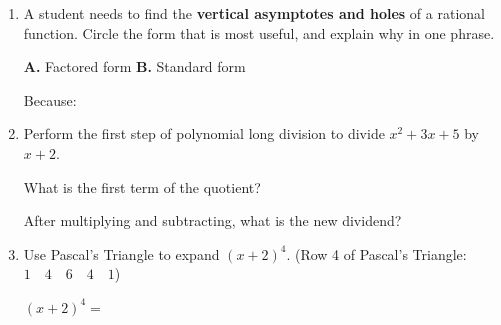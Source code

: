 \documentclass[10pt]{article}
\begin{document}
\namedateperiod

\vspace{0.14in}

\begin{enumerate}[itemsep=16pt]

\item A student needs to find the \textbf{vertical asymptotes and holes} of a rational function.
      Circle the form that is most useful, and explain why in one phrase.

      \medskip
      \textbf{A.} Factored form \qquad\qquad \textbf{B.} Standard form

      \vspace{0.06in}
      Because: \writeline

\item Perform the first step of polynomial long division to divide $x^2 + 3x + 5$ by $x + 2$.

      What is the first term of the quotient? \blank{3cm}

      After multiplying and subtracting, what is the new dividend? \blank{5cm}

\item Use Pascal's Triangle to expand $(x + 2)^4$.
      (Row 4 of Pascal's Triangle: $1 \quad 4 \quad 6 \quad 4 \quad 1$)

      \vspace{0.06in}
      $(x+2)^4 = $ \blank{9cm}

\end{enumerate}
\end{document}
